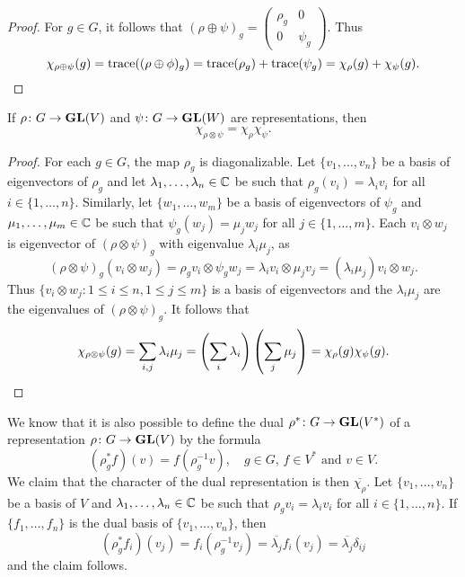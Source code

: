 \begin{proof}
  For $g\in G$, it follows that 
  $(\rho\oplus\psi)_g=
  \begin{pmatrix}
    \rho_g & 0\\ 
    0 & \psi_g
  \end{pmatrix}$. 
  Thus  
  \[
    \chi_{\rho\oplus\psi}(g)=\operatorname{trace}((\rho\oplus\phi)_g)=\operatorname{trace}(\rho_g)+\operatorname{trace}(\psi_g)=\chi_\rho(g)+\chi_\psi(g).\qedhere
  \]
\end{proof}

\begin{proposition}
  	If $\rho\colon G\to\mathbf{GL}(V)$ and
    $\psi\colon G\to\mathbf{GL}(W)$ are representations, then
    \[
    \chi_{\rho\otimes\psi}=\chi_\rho\chi_\psi.
    \]
\end{proposition}

\begin{proof}
	For each $g\in G$, the map $\rho_g$ is diagonalizable. Let $\{v_1,\dots,v_n\}$
	be a basis of eigenvectors of $\rho_g$ and let $\lambda_1,\dots,\lambda_n\in\mathbb{C}$ be such that
	$\rho_g(v_i)=\lambda_iv_i$ for all $i\in\{1,\dots,n\}$. Similarly, 
	let $\{w_1,\dots,w_m\}$ be a basis of 
	eigenvectors of $\psi_g$ and $\mu_1,\dots,\mu_m\in\mathbb{C}$ be such that $\psi_g(w_j)=\mu_jw_j$ for all $j\in\{1,\dots,m\}$. Each 
	$v_i\otimes w_j$ is eigenvector of $(\rho\otimes\psi)_g$ with eigenvalue 
	$\lambda_i\mu_j$, as  
	\[
		(\rho\otimes\psi)_g(v_i\otimes w_j)=\rho_gv_i\otimes \psi_gw_j=\lambda_iv_i\otimes \mu_jv_j=(\lambda_i\mu_j)v_i\otimes w_j.
	\]
	Thus  
	$\{v_i\otimes w_j:1\leq i\leq n,1\leq j\leq m\}$ is a basis of eigenvectors and the 
	$\lambda_i\mu_j$ are the eigenvalues of $(\rho\otimes\psi)_g$. It follows that 
	\[
	\chi_{\rho\otimes\psi}(g)
	=\sum_{i,j}\lambda_i\mu_j
	=\left(\sum_i\lambda_i\right)\left(\sum_j\mu_j\right)
	=\chi_\rho(g)\chi_\psi(g).\qedhere 
	\]
\end{proof}

We know that
it is also possible to define the dual $\rho^*\colon G\to\mathbf{GL}(V^*)$  
of a representation
$\rho\colon G\to\mathbf{GL}(V)$ by the formula
\[
(\rho^*_gf)(v)=f(\rho^{-1}_gv),\quad
g\in G,\,f\in V^*\text{ and }v\in V.
\]  
We claim that the character of the dual representation is then 
$\overline{\chi_\rho}$. Let $\{v_1,\dots,v_n\}$ be a basis of $V$
and $\lambda_1,\dots,\lambda_n\in\mathbb{C}$ be such that $\rho_gv_i=\lambda_iv_i$ for all $i\in\{1,\dots,n\}$. If $\{f_1,\dots,f_n\}$ is the dual basis of $\{v_1,\dots,v_n\}$, then 
\[
(\rho^*_gf_i)(v_j)=f_i(\rho_g^{-1}v_j)
=\overline{\lambda_j}f_i(v_j)
=\overline{\lambda_j}\delta_{ij}
\]
and the claim follows. 

